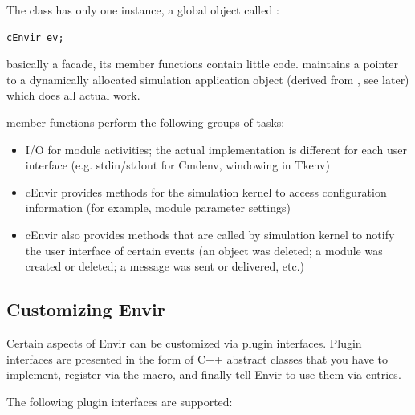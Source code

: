 The  class has only one instance, a global object
called :

\begin{verbatim}
cEnvir ev;
\end{verbatim}

 basically a facade, its member functions
contain little code.  maintains a pointer to a
dynamically allocated simulation application object (derived from
, see later) which does all actual work.


 member functions perform the following groups of tasks:
\begin{itemize}
  \item I/O for module activities; the actual implementation is different
    for each user interface (e.g. stdin/stdout for Cmdenv, windowing
    in Tkenv)
  \item cEnvir provides methods for the simulation kernel to
    access configuration information (for example, module parameter settings)
  \item cEnvir also provides methods that are called by simulation kernel to
    notify the user interface of certain events (an object was deleted;
    a module was created or deleted; a message was sent or delivered, etc.)
\end{itemize}


\subsection{Customizing Envir}
\label{sec:ch-opp-design:customization}

Certain aspects of Envir can be customized via plugin interfaces.
Plugin interfaces are presented in the form of C++ abstract classes
that you have to implement, register via the 
macro, and finally tell Envir to use them via  entries.

The following plugin interfaces are supported:

